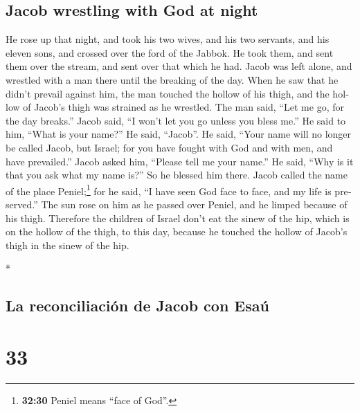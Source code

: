 \begin{paracol}{2}
\begin{otherlanguage}{english}
\hypertarget{jacob-wrestling-with-god-at-night}{%
\subsection{Jacob wrestling with God at
night}\label{jacob-wrestling-with-god-at-night}}

 He rose up that night, and took his two wives, and his
two servants, and his eleven sons, and crossed over the ford of the
Jabbok.  He took them, and sent them over the stream, and
sent over that which he had.  Jacob was left alone, and
wrestled with a man there until the breaking of the day. 
When he saw that he didn't prevail against him, the man touched the
hollow of his thigh, and the hollow of Jacob's thigh was strained as he
wrestled.  The man said, ``Let me go, for the day
breaks.'' Jacob said, ``I won't let you go unless you bless me.''
 He said to him, ``What is your name?'' He said,
``Jacob''.  He said, ``Your name will no longer be called
Jacob, but Israel; for you have fought with God and with men, and have
prevailed.''  Jacob asked him, ``Please tell me your
name.'' He said, ``Why is it that you ask what my name is?'' So he
blessed him there.  Jacob called the name of the place
Peniel;\footnote{\textbf{32:30} Peniel means ``face of God''.} for he
said, ``I have seen God face to face, and my life is preserved.''
 The sun rose on him as he passed over Peniel, and he
limped because of his thigh.  Therefore the children of
Israel don't eat the sinew of the hip, which is on the hollow of the
thigh, to this day, because he touched the hollow of Jacob's thigh in
the sinew of the hip.

\end{otherlanguage}

\switchcolumn[0]*

\hypertarget{la-reconciliaciuxf3n-de-jacob-con-esauxfa}{%
\subsection{La reconciliación de Jacob con
Esaú}\label{la-reconciliaciuxf3n-de-jacob-con-esauxfa}}

\hypertarget{section-64}{%
\section{33}\label{section-64}}


\end{paracol}
